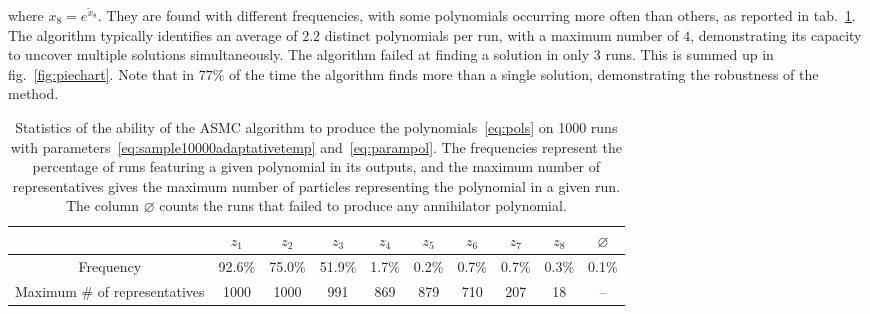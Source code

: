 \documentclass[11pt,a4paper]{article}
\begin{document}
	where $x_{8} = e^{\tilde{x}_{8}}$. They are found with different frequencies, with some polynomials occurring more often than others, as reported in tab.~\ref{table:results}. The algorithm typically identifies an average of $2.2$ distinct polynomials per run, with a maximum number of $4$, demonstrating its capacity to uncover multiple solutions simultaneously. The algorithm failed at finding a solution in only 3 runs. This is summed up in fig.~\ref{fig:piechart}. Note that in $77\%$ of the time the algorithm finds more than a single solution, demonstrating the robustness of the method.

	\begin{table}
		\centering
		\renewcommand{\arraystretch}{1.3}
		\begin{tabular}{c|ccccccccc}
			& $z_{1}$ & $z_{2}$ & $z_{3}$ & $z_{4}$ & $z_{5}$ & $z_{6}$ & $z_{7}$  & $z_{8}$&  $\varnothing$  \\\hline\hline
			Frequency & 92.6\% & 75.0\% & 51.9\% & 1.7\% & 0.2\% & 0.7\% & 0.7\% & 0.3\% & 0.1\% \\
			Maximum \# of representatives & 1000 & 1000 & 991 & 869 & 879 & 710 & 207 & 18 & --
		\end{tabular}
		\caption{Statistics of the ability of the ASMC algorithm to produce the polynomials~\eqref{eq:pols} on 1000 runs with parameters~\eqref{eq:sample10000adaptativetemp} and~\eqref{eq:parampol}. The frequencies represent the percentage of runs featuring a given polynomial in its outputs, and the maximum number of representatives gives the maximum number of particles representing the polynomial in a given run. The column $\varnothing$ counts the runs that failed to produce any annihilator polynomial.}
		\label{table:results}
	\end{table}
\end{document}

